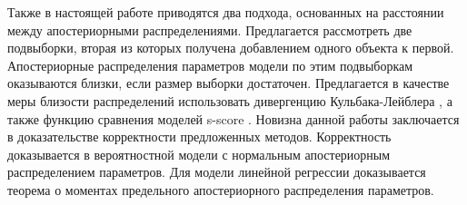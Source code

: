 Также в настоящей работе приводятся два подхода, основанных на расстоянии между апостериорными распределениями. Предлагается рассмотреть две подвыборки, вторая из которых получена добавлением одного объекта к первой. Апостериорные распределения параметров модели по этим подвыборкам оказываются близки, если размер выборки достаточен. Предлагается в качестве меры близости распределений использовать дивергенцию Кульбака-Лейблера \cite{MOTRENKO2014743}, а также функцию сравнения моделей s-score \cite{Aduenko2017}. Новизна данной работы заключается в доказательстве корректности предложенных методов. Корректность доказывается в вероятностной модели с нормальным апостериорным распределением параметров. Для модели линейной регрессии доказывается теорема о моментах предельного апостериорного распределения параметров.